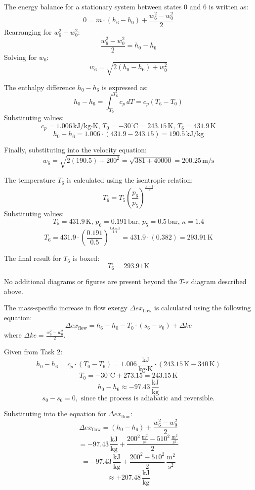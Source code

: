 The energy balance for a stationary system between states 0 and 6 is written as:  
\[
0 = \dot{m} \cdot (h_6 - h_0) + \frac{w_6^2 - w_0^2}{2}
\]  
Rearranging for \( w_6^2 - w_0^2 \):  
\[
\frac{w_6^2 - w_0^2}{2} = h_0 - h_6
\]  
Solving for \( w_6 \):  
\[
w_6 = \sqrt{2(h_0 - h_6) + w_0^2}
\]  

The enthalpy difference \( h_0 - h_6 \) is expressed as:  
\[
h_0 - h_6 = \int_{T_0}^{T_6} c_p \, dT = c_p (T_6 - T_0)
\]  
Substituting values:  
\[
c_p = 1.006 \, \text{kJ/kg·K}, \, T_0 = -30^\circ\text{C} = 243.15 \, \text{K}, \, T_6 = 431.9 \, \text{K}
\]  
\[
h_0 - h_6 = 1.006 \cdot (431.9 - 243.15) = 190.5 \, \text{kJ/kg}
\]  

Finally, substituting into the velocity equation:  
\[
w_6 = \sqrt{2(190.5) + 200^2} = \sqrt{381 + 40000} = 200.25 \, \text{m/s}
\]  

The temperature \( T_6 \) is calculated using the isentropic relation:  
\[
T_6 = T_5 \left( \frac{p_6}{p_5} \right)^{\frac{\kappa - 1}{\kappa}}
\]  
Substituting values:  
\[
T_5 = 431.9 \, \text{K}, \, p_6 = 0.191 \, \text{bar}, \, p_5 = 0.5 \, \text{bar}, \, \kappa = 1.4
\]  
\[
T_6 = 431.9 \cdot \left( \frac{0.191}{0.5} \right)^{\frac{1.4 - 1}{1.4}} = 431.9 \cdot (0.382) = 293.91 \, \text{K}
\]  

The final result for \( T_6 \) is boxed:  
\[
T_6 = 293.91 \, \text{K}
\]  

No additional diagrams or figures are present beyond the \( T \)-\( s \) diagram described above.

The mass-specific increase in flow exergy \( \Delta ex_{\text{flow}} \) is calculated using the following equation:  
\[
\Delta ex_{\text{flow}} = h_6 - h_0 - T_0 \cdot (s_6 - s_0) + \Delta ke
\]
where \( \Delta ke = \frac{w_6^2 - w_0^2}{2} \).  

Given from Task 2:  
\[
h_0 - h_6 = c_p \cdot (T_0 - T_6) = 1.006 \, \frac{\text{kJ}}{\text{kg·K}} \cdot (243.15 \, \text{K} - 340 \, \text{K})
\]
\[
T_0 = -30^\circ\text{C} + 273.15 = 243.15 \, \text{K}
\]
\[
h_0 - h_6 \approx -97.43 \, \frac{\text{kJ}}{\text{kg}}
\]
\[
s_0 - s_6 = 0, \text{ since the process is adiabatic and reversible.}
\]

Substituting into the equation for \( \Delta ex_{\text{flow}} \):  
\[
\Delta ex_{\text{flow}} = (h_0 - h_6) + \frac{w_6^2 - w_0^2}{2}
\]
\[
= -97.43 \, \frac{\text{kJ}}{\text{kg}} + \frac{200^2 \, \frac{\text{m}^2}{\text{s}^2} - 510^2 \, \frac{\text{m}^2}{\text{s}^2}}{2}
\]
\[
= -97.43 \, \frac{\text{kJ}}{\text{kg}} + \frac{200^2 - 510^2}{2} \, \frac{\text{m}^2}{\text{s}^2}
\]
\[
\approx +207.48 \, \frac{\text{kJ}}{\text{kg}}
\]